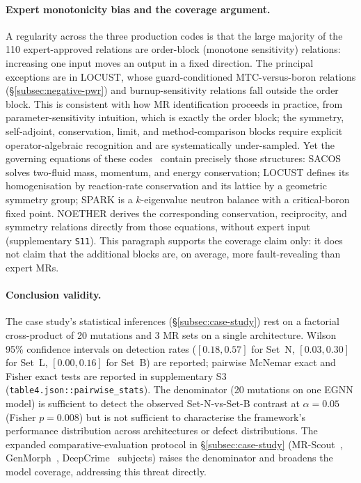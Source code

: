\documentclass[manuscript]{acmart}
\begin{document}
\paragraph{Expert monotonicity bias and the coverage argument.} A regularity across the three production codes is that the large majority of the 110 expert-approved relations are order-block (monotone sensitivity) relations: increasing one input moves an output in a fixed direction. The principal exceptions are in LOCUST, whose guard-conditioned MTC-versus-boron relations (\S\ref{subsec:negative-pwr}) and burnup-sensitivity relations fall outside the order block. This is consistent with how MR identification proceeds in practice, from parameter-sensitivity intuition, which is exactly the order block; the symmetry, self-adjoint, conservation, limit, and method-comparison blocks require explicit operator-algebraic recognition and are systematically under-sampled. Yet the governing equations of these codes~\cite{LamarshBaratta2001, Stacey2007} contain precisely those structures: SACOS solves two-fluid mass, momentum, and energy conservation; LOCUST defines its homogenisation by reaction-rate conservation and its lattice by a geometric symmetry group; SPARK is a $k$-eigenvalue neutron balance with a critical-boron fixed point. NOETHER derives the corresponding conservation, reciprocity, and symmetry relations directly from those equations, without expert input (supplementary \texttt{S11}). This paragraph supports the coverage claim only: it does not claim that the additional blocks are, on average, more fault-revealing than expert MRs.

\paragraph{Conclusion validity.} The case study's statistical inferences (\S\ref{subsec:case-study}) rest on a factorial cross-product of 20 mutations and 3 MR sets on a single architecture. Wilson 95\% confidence intervals on detection rates ($[0.18,0.57]$ for Set~N, $[0.03,0.30]$ for Set~L, $[0.00,0.16]$ for Set~B) are reported; pairwise McNemar exact and Fisher exact tests are reported in supplementary S3 (\texttt{table4.json::pairwise\_stats}). The denominator (20 mutations on one EGNN model) is sufficient to detect the observed Set-N-vs-Set-B contrast at $\alpha = 0.05$ (Fisher $p = 0.008$) but is not sufficient to characterise the framework's performance distribution across architectures or defect distributions. The expanded comparative-evaluation protocol in \S\ref{subsec:case-study} (MR-Scout~\cite{MRScout2024}, GenMorph~\cite{GenMorph2024}, DeepCrime~\cite{Humbatova2021DeepCrime} subjects) raises the denominator and broadens the model coverage, addressing this threat directly.
\end{document}
